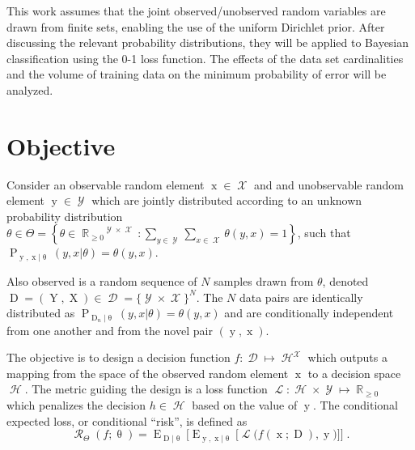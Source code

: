 \documentclass[conference]{IEEEtran}
\DeclareMathOperator{\xrm}{\mathrm{x}}
\DeclareMathOperator{\Xrm}{\mathrm{X}}
\DeclareMathOperator{\yrm}{\mathrm{y}}
\DeclareMathOperator{\Yrm}{\mathrm{Y}}
\DeclareMathOperator{\Drm}{\mathrm{D}}
\DeclareMathOperator{\Prm}{\mathrm{P}}
\DeclareMathOperator{\Erm}{\mathrm{E}}
\DeclareMathOperator{\Xcal}{\mathcal{X}}
\DeclareMathOperator{\Ycal}{\mathcal{Y}}
\DeclareMathOperator{\Dcal}{\mathcal{D}}
\DeclareMathOperator{\Hcal}{\mathcal{H}}
\DeclareMathOperator{\Rcal}{\mathcal{R}}
\DeclareMathOperator{\Lcal}{\mathcal{L}}
\DeclareMathOperator{\Rbb}{\mathbb{R}}
\begin{document}
This work assumes that the joint observed/unobserved random variables are drawn from finite sets, enabling the use of the uniform Dirichlet prior. After discussing the relevant probability distributions, they will be applied to Bayesian classification using the 0-1 loss function. The effects of the data set cardinalities and the volume of training data on the minimum probability of error will be analyzed.







\section{Objective}

Consider an observable random element $\xrm \in \Xcal$ and and unobservable random element $\yrm \in \Ycal$ which are jointly distributed according to an unknown probability distribution $\theta \in \Theta = \left\{ \theta \in {\Rbb_{\geq 0}}^{\Ycal \times \Xcal}: \sum_{y \in \Ycal} \sum_{x \in \Xcal} \theta(y,x) = 1 \right\}$, such that $\Prm_{\yrm,\xrm | \uptheta}(y,x | \theta) = \theta(y,x)$. 

Also observed is a random sequence of $N$ samples drawn from $\theta$, denoted $\Drm = ( \Yrm,\Xrm ) \in \Dcal = \{\Ycal \times \Xcal\}^N$. The $N$ data pairs are identically distributed as $\Prm_{\Drm_n | \uptheta}(y,x | \theta) = \theta(y,x)$ and are conditionally independent from one another and from the novel pair $(\yrm,\xrm)$.

The objective is to design a decision function $f: \Dcal \mapsto \Hcal^{\Xcal}$ which outputs a mapping from the space of the observed random element $\xrm$ to a decision space $\Hcal$. The metric guiding the design is a loss function $\Lcal: \Hcal \times \Ycal \mapsto \Rbb_{\geq 0}$ which penalizes the decision $h \in \Hcal$ based on the value of $\yrm$. The conditional expected loss, or conditional ``risk'', is defined as
\begin{equation} \label{eq:risk_cond}
\Rcal_{\Theta}(f ; \uptheta) = \Erm_{\Drm | \uptheta} \bigg[ \Erm_{\yrm,\xrm | \uptheta} \Big[ \Lcal\big( f(\xrm;\Drm),\yrm \big) \Big] \bigg] \;.
\end{equation}
\end{document}
